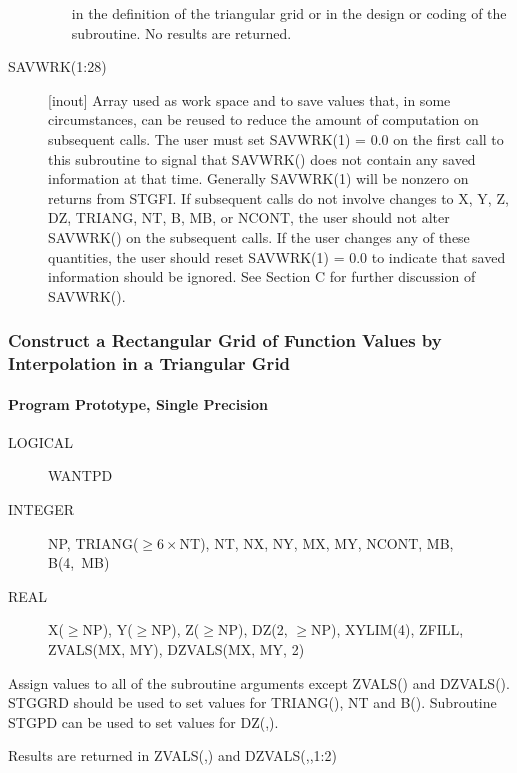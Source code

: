 \documentclass[twoside]{MATH77}
\begin{document}
\begin{description}
\begin{itemize}
in the definition of the triangular grid or in the design or coding
of the subroutine.  No results are returned.
\end{itemize}
\item[SAVWRK(1:28)] [inout] Array used as work space and to save values
that, in some circumstances, can be reused to reduce the amount of
computation on subsequent calls.  The user must set SAVWRK(1) = 0.0 on the
first call to this subroutine to signal that SAVWRK() does not contain any
saved information at that time.  Generally SAVWRK(1) will be nonzero on
returns from STGFI.  If subsequent calls do not involve changes to X, Y,
Z, DZ, TRIANG, NT, B, MB, or NCONT, the user should not alter SAVWRK() on
the subsequent calls.  If the user changes any of these quantities, the
user should reset SAVWRK(1) = 0.0 to indicate that saved information
should be ignored.  See Section C for further discussion of SAVWRK().
\end{description}

\subsubsection{Construct a Rectangular Grid of Function Values by
Interpolation in a Triangular Grid}

\paragraph{Program Prototype, Single Precision}

\begin{description}
\item[LOGICAL] WANTPD
\item[INTEGER]  NP, TRIANG($\geq 6 \times$NT), NT, NX, NY,\newline
MX, MY, NCONT, MB, B(4,~MB)
\item[REAL] X($\geq$NP), Y($\geq$NP), Z($\geq$NP),
DZ(2, $\geq$NP),\newline
XYLIM(4), ZFILL, ZVALS(MX, MY),\newline
DZVALS(MX, MY, 2)
\end{description}
Assign values to all of the subroutine arguments except ZVALS() and
DZVALS().  STGGRD should be used to set values for TRIANG(), NT and B().
Subroutine STGPD can be used to set values for DZ(,).
\begin{center}
\end{center}
Results are returned in ZVALS(,) and DZVALS(,,1:2)
\end{document}
